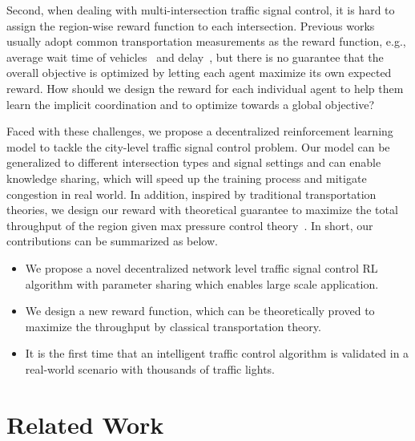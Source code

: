 Second, when dealing with multi-intersection traffic signal control, it is hard to assign the region-wise reward function to each intersection. Previous works~\cite{nishi2018traffic,ElAb12,van2016coordinated} usually adopt common transportation measurements as the reward function, e.g., average wait time of vehicles~\cite{nishi2018traffic} and delay~\cite{ElAb12,van2016coordinated}, but there is no guarantee that the overall objective is optimized by letting each agent maximize its own expected reward. How should we design the reward for each individual agent to help them learn the implicit coordination and to optimize towards a global objective? 


Faced with these challenges, we propose a decentralized reinforcement learning model to tackle the city-level traffic signal control problem. Our model can be generalized to different intersection types and signal settings and can enable knowledge sharing, which will speed up the training process and mitigate congestion in real world. In addition, inspired by traditional transportation theories, we design our reward with theoretical guarantee to maximize the total throughput of the region given max pressure control theory~\cite{varaiya2013max}. In short, our contributions can be summarized as below.

\begin{itemize}
\item We propose a novel decentralized network level traffic signal control RL algorithm with parameter sharing which enables large scale application. 
\item We design a new reward function, which can be theoretically proved to maximize the throughput by classical transportation theory. 
\item It is the first time that an intelligent traffic control algorithm is  validated in a real-world scenario with thousands of traffic lights.
\end{itemize}

\section{Related Work}


